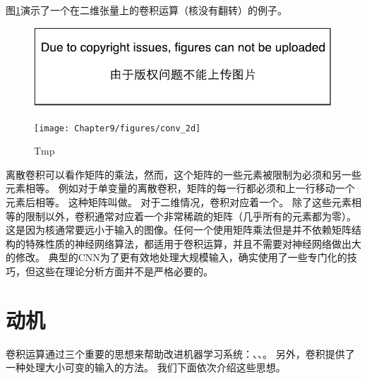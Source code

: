 图\ref{fig:chap9_conv_2d}演示了一个在二维张量上的卷积运算（核没有翻转）的例子。
\begin{figure}[!htb]
\ifOpenSource
\centerline{\includegraphics{figure.pdf}}
\else
\centerline{\texttt{[image: Chapter9/figures/conv\_2d]}}
\fi
\caption{Tmp}
\label{fig:chap9_conv_2d}
\end{figure}

离散卷积可以看作矩阵的乘法，然而，这个矩阵的一些元素被限制为必须和另一些元素相等。
例如对于单变量的离散卷积，矩阵的每一行都必须和上一行移动一个元素后相等。
这种矩阵叫做。
对于二维情况，卷积对应着一个。
除了这些元素相等的限制以外，卷积通常对应着一个非常稀疏的矩阵（几乎所有的元素都为零）。
这是因为核通常要远小于输入的图像。任何一个使用矩阵乘法但是并不依赖矩阵结构的特殊性质的神经网络算法，都适用于卷积运算，并且不需要对神经网络做出大的修改。
典型的\gls{CNN}为了更有效地处理大规模输入，确实使用了一些专门化的技巧，但这些在理论分析方面并不是严格必要的。

 
\section{动机}
\label{sec:motivation}

卷积运算通过三个重要的思想来帮助改进机器学习系统：、、。
另外，卷积提供了一种处理大小可变的输入的方法。
我们下面依次介绍这些思想。

